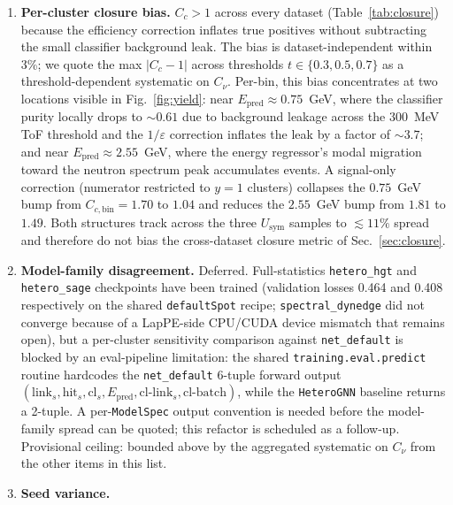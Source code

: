 \documentclass[aps,prc,twocolumn,superscriptaddress,showpacs,%
               nofootinbib,floatfix,longbibliography]{revtex4-2}
\newcommand{\eff}{\varepsilon}
\newcommand{\Usym}{U_{\text{sym}}}
\begin{document}
\begin{enumerate}
    any per-event yield-ratio interpretation.  Mitigation is
    deferred (differentiable clustering, or a
    $k$-conditional unfold --- Sec.~\ref{sec:summary}).
  \item \textbf{Per-cluster closure bias.}
    $C_c > 1$ across every dataset (Table~\ref{tab:closure}) because
    the efficiency correction inflates true positives without
    subtracting the small classifier background leak.  The bias is
    dataset-independent within 3\%; we quote the max
    $|C_c - 1|$ across thresholds $t \in \{0.3, 0.5, 0.7\}$ as a
    threshold-dependent systematic on $C_\nu$.  Per-bin, this bias
    concentrates at two locations visible in Fig.~\ref{fig:yield}:
    near $E_{\text{pred}} \approx 0.75$~GeV, where the classifier
    purity locally drops to $\sim 0.61$ due to background leakage
    across the $300$~MeV ToF threshold and the $1/\eff$ correction
    inflates the leak by a factor of $\sim 3.7$; and near
    $E_{\text{pred}} \approx 2.55$~GeV, where the energy regressor's
    modal migration toward the neutron spectrum peak accumulates
    events.  A signal-only correction (numerator restricted to
    $y = 1$ clusters) collapses the $0.75$~GeV bump from
    $C_{c,\text{bin}} = 1.70$ to $1.04$ and reduces the $2.55$~GeV
    bump from $1.81$ to $1.49$.  Both structures track across the
    three $\Usym$ samples to $\lesssim 11\%$ spread and therefore
    do not bias the cross-dataset closure metric of
    Sec.~\ref{sec:closure}.
  \item \textbf{Model-family disagreement.} Deferred.
    Full-statistics \texttt{hetero\_hgt} and \texttt{hetero\_sage}
    checkpoints have been trained (validation losses 0.464 and
    0.408 respectively on the shared \texttt{defaultSpot} recipe;
    \texttt{spectral\_dynedge} did not converge because of a
    LapPE-side CPU/CUDA device mismatch that remains open), but a
    per-cluster sensitivity comparison against \texttt{net\_default}
    is blocked by an eval-pipeline limitation: the shared
    \texttt{training.eval.predict} routine hardcodes the
    \texttt{net\_default} 6-tuple forward output
    $(\text{link}_s, \text{hit}_s, \text{cl}_s, E_{\text{pred}},
    \text{cl-link}_s, \text{cl-batch})$, while the \texttt{HeteroGNN}
    baseline returns a 2-tuple.  A per-\texttt{ModelSpec} output
    convention is needed before the model-family spread can be
    quoted; this refactor is scheduled as a follow-up.  Provisional
    ceiling: bounded above by the aggregated systematic on
    $C_\nu$ from the other items in this list.
  \item \label{sys:seed}\textbf{Seed variance.}

\end{enumerate}
\end{document}
